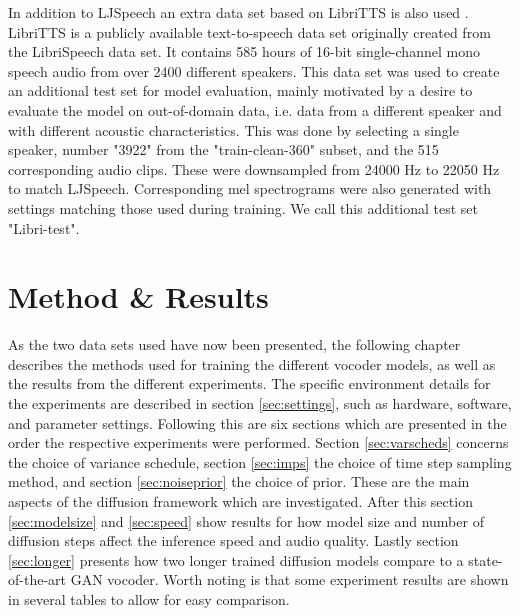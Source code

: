 \documentclass{report}
\begin{document}
In addition to LJSpeech an extra data set based on LibriTTS is also used \cite{zen2019libritts}. LibriTTS is a publicly available text-to-speech data set originally created from the LibriSpeech data set. It contains 585 hours of 16-bit single-channel mono speech audio from over 2400 different speakers. This data set was used to create an additional test set for model evaluation, mainly motivated by a desire to evaluate the model on out-of-domain data, i.e. data from a different speaker and with different acoustic characteristics. This was done by selecting a single speaker, number "3922" from the "train-clean-360" subset, and the 515 corresponding audio clips. These were downsampled from 24000 Hz to 22050 Hz to match LJSpeech. Corresponding mel spectrograms were also generated with settings matching those used during training. We call this additional test set "Libri-test".


\newpage
\chapter{Method \& Results} \label{sec:method}

As the two data sets used have now been presented, the following chapter describes the methods used for training the different vocoder models, as well as the results from the different experiments. The specific environment details for the experiments are described in section \ref{sec:settings}, such as hardware, software, and parameter settings. Following this are six sections which are presented in the order the respective experiments were performed. Section \ref{sec:varscheds} concerns the choice of variance schedule, section \ref{sec:imps} the choice of time step sampling method, and section \ref{sec:noiseprior} the choice of prior. These are the main aspects of the diffusion framework which are investigated. After this section \ref{sec:modelsize} and \ref{sec:speed} show results for how model size and number of diffusion steps affect the inference speed and audio quality. Lastly section \ref{sec:longer} presents how two longer trained diffusion models compare to a state-of-the-art GAN vocoder. Worth noting is that some experiment results are shown in several tables to allow for easy comparison.
\end{document}
